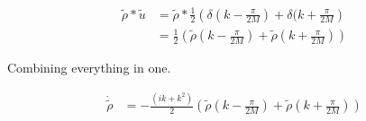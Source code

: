 \documentclass[a4paper]{article}
\begin{document}
\begin{align*}
\tilde{\rho} * \tilde{u} & = \tilde{\rho} * \frac{1}{2} \left( \delta ( k - \frac{\pi}{2 M} ) + \delta ( k + \frac{\pi}{2 M} \right) \\
& = \frac{1}{2} \left( \tilde{\rho} ( k - \frac{\pi}{2 M} ) + \tilde{\rho} ( k + \frac{\pi}{2 M} ) \right)
\end{align*}

Combining everything in one. 

\begin{align*}
\dot{\tilde{\rho}} & = - \frac{(ik + k ^2 )}{2}  \left( \tilde{\rho} ( k - \frac{\pi}{2 M} ) + \tilde{\rho} ( k + \frac{\pi}{2 M} ) \right) 
\end{align*}
\end{document}
